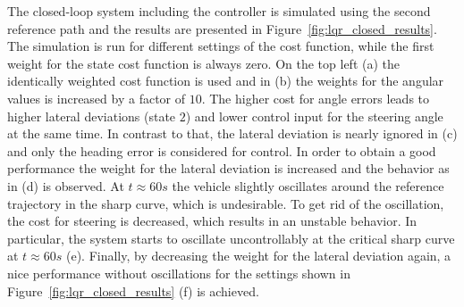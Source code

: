The closed-loop system including the controller is simulated using the second reference path and the results are presented in Figure~\ref{fig:lqr_closed_results}.
The simulation is run for different settings of the cost function, while the first weight for the state cost function is always zero.
On the top left (a) the identically weighted cost function is used and in (b) the weights for the angular values is increased by a factor of $10$.
The higher cost for angle errors leads to higher lateral deviations (state $2$) and lower control input for the steering angle at the same time.
In contrast to that, the lateral deviation is nearly ignored in (c) and only the heading error is considered for control.
In order to obtain a good performance the weight for the lateral deviation is increased and the behavior as in (d) is observed. 
At $t \approx 60s$ the vehicle slightly oscillates around the reference trajectory in the sharp curve, which is undesirable.
To get rid of the oscillation, the cost for steering is decreased, which results in an unstable behavior.
In particular, the system starts to oscillate uncontrollably at the critical sharp curve at $t \approx 60s$ (e).
Finally, by decreasing the weight for the lateral deviation again, a nice performance without oscillations for the settings shown in Figure~\ref{fig:lqr_closed_results} (f) is achieved.


